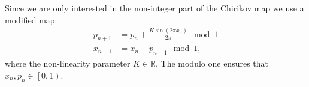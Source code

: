 
Since we are only interested in the non-integer part of the Chirikov map we use a modified map:
\begin{subequations}\label{eq:chirikov}
	\begin{align}
		\label{eq:chirikov:p} p_{n + 1} &= p_n + \frac{K \sin \left(  2 \pi x_n \right)}{2 \pi} \mod 1 \\
		\label{eq:chirikov:x} x_{n + 1} &= x_n + p_{n + 1} \mod 1,
	\end{align}
\end{subequations}	
where the non-linearity parameter $K \in \mathbb{R}$. The modulo one ensures that $x_n, p_n \in \left[ 0, 1 \right)$.

